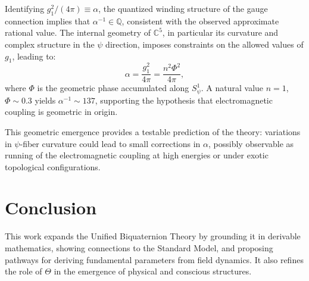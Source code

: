 \documentclass[12pt]{article}
\begin{document}
Identifying \( g_1^2 / (4\pi) \equiv \alpha \), the quantized winding structure of the gauge connection implies that \( \alpha^{-1} \in \mathbb{Q} \), consistent with the observed approximate rational value. The internal geometry of \( \mathbb{C}^5 \), in particular its curvature and complex structure in the \( \psi \) direction, imposes constraints on the allowed values of \( g_1 \), leading to:
\[
\alpha = \frac{g_1^2}{4\pi} = \frac{n^2 \Phi^2}{4\pi},
\]
where \( \Phi \) is the geometric phase accumulated along \( S^1_\psi \). A natural value \( n = 1 \), \( \Phi \sim 0.3 \) yields \( \alpha^{-1} \sim 137 \), supporting the hypothesis that electromagnetic coupling is geometric in origin.

This geometric emergence provides a testable prediction of the theory: variations in \( \psi \)-fiber curvature could lead to small corrections in \( \alpha \), possibly observable as running of the electromagnetic coupling at high energies or under exotic topological configurations.

\section{Conclusion}
This work expands the Unified Biquaternion Theory by grounding it in derivable mathematics, showing connections to the Standard Model, and proposing pathways for deriving fundamental parameters from field dynamics. It also refines the role of \( \Theta \) in the emergence of physical and conscious structures.
\end{document}
